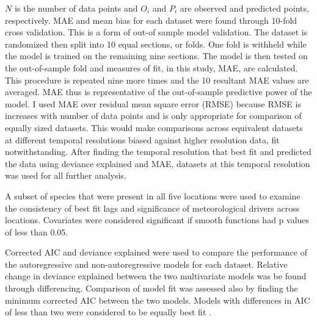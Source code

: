 $N$ is the number of data points and $O_i$ and $P_i$ are observed and predicted points, respectively. MAE and mean bias for each dataset were found through 10-fold cross validation.  This is a form of out-of sample model validation. The dataset is randomized then split into 10 equal sections, or folds. One fold is withheld while the model is trained on the remaining nine sections. The model is then tested on the out-of-sample fold and measures of fit, in this study, MAE, are calculated. This procedure is repeated nine more times and the 10 resultant MAE values are averaged. MAE thus is representative of the out-of-sample predictive power of the model. I used MAE over residual mean square error (RMSE) because RMSE is increases with number of data points and is only appropriate for comparison of equally sized datasets. This would make comparisons across equivalent datasets at different temporal resolutions biased against higher resolution data, fit notwithstanding. After finding the temporal resolution that best fit and predicted the data using deviance explained and MAE, datasets at this temporal resolution was used for all further analysis.%

A subset of species that were present in all five locations were used to examine the consistency of best fit lags and significance of meteorological drivers across locations.  Covariates were considered significant if smooth functions had p values of less than 0.05. %

Corrected AIC and deviance explained were used to compare the performance of the autoregressive and non-autoregressive models for each dataset. Relative change in deviance explained between the two multivariate models was be found through differencing. Comparison of model fit was assessed also by finding the minimum corrected AIC between the two models. Models with differences in AIC of less than two were considered to be equally best fit \citep{JOHNSON2004101}.





